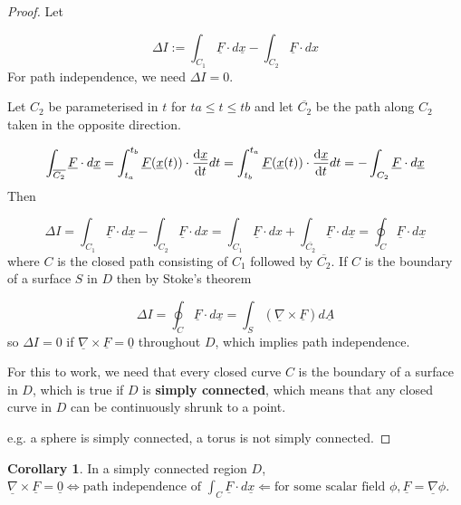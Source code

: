 \documentclass[12pt,a4paper]{article}
\theoremstyle{definition}
\newtheorem{corollary}[definition]{Corollary}
\begin{document}
\begin{proof}
	Let

	\[ \Delta I := \int_{C_1} \underline{F} \cdot d\underline{x} - \int_{C_2} \underline{F} \cdot dx \]
	For path independence, we need $\Delta I = 0$.

	Let $C_2$ be parameterised in $t$ for $ta \le t \le tb$ and let $\overline{C_2}$ be the path along $C_2$ taken in the opposite direction.

	\[ \int_{\overline{C_2}} \underline{F} \cdot d\underline{x} = \int_{t_a}^{t_b} \underline{F}(\underline{x}(t)) \cdot \diff{\underline{x}}{t} dt = \int_{t_b}^{t_a} \underline{F}(\underline{x}(t)) \cdot \diff{\underline{x}}{t} dt = -\int_{C_2} \underline{F} \cdot d\underline{x} \]
	Then
	
	\[ \Delta I = \int_{C_1} \underline{F} \cdot d\underline{x} - \int_{C_2} \underline{F} \cdot dx = \int_{C_1} \underline{F} \cdot dx + \int_{\overline{C_2}} \underline{F} \cdot d\underline{x} = \oint_C \underline{F} \cdot d\underline{x} \]
	where $C$ is the closed path consisting of $C_1$ followed by $\overline{C_2}$. If $C$ is the boundary of a surface $S$ in $D$ then by Stoke's theorem

	\[ \Delta I = \oint_C \underline{F} \cdot d\underline{x} = \int_S (\underline{\nabla} \times \underline{F}) d\underline{A} \]
	so $\Delta I = 0$ if $\underline{\nabla} \times \underline{F} = \underline{0}$ throughout $D$, which implies path independence.

	For this to work, we need that every closed curve $C$ is the boundary of a surface in $D$, which is true if $D$ is \textbf{simply connected}, which means that any closed curve in $D$ can be continuously shrunk to a point.

	e.g. a sphere is simply connected, a torus is not simply connected.
\end{proof}

\begin{corollary}
	In a simply connected region $D$, $\underline{\nabla} \times \underline{F} = \underline{0} \Leftrightarrow \text{path independence of } \int_C \underline{F} \cdot d\underline{x} \Leftarrow \text{for some scalar field } \phi, \underline{F} = \underline{\nabla} \phi$.
\end{corollary}
\end{document}
